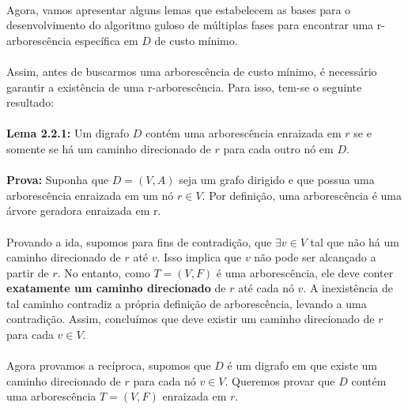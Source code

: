 \documentclass[12pt,a4paper]{article}
\begin{document}
\paragraph{}
Agora, vamos apresentar alguns lemas que estabelecem as bases para o desenvolvimento do algoritmo guloso de múltiplas fases para encontrar uma r-arborescência específica em \(D \) de custo mínimo.

\paragraph{}
Assim, antes de buscarmos uma arborescência de custo mínimo, é necessário garantir a existência de uma r-arborescência. Para isso, tem-se o seguinte resultado:

\paragraph{}
\textbf{Lema 2.2.1:} Um digrafo \(D\) contém uma arborescência enraizada em \(r\) se e somente se há um caminho direcionado de \(r\) para cada outro nó em \(D\).

\paragraph{}
\textbf{Prova:} Suponha que \(D = (V, A)\) seja um grafo dirigido e que possua uma arborescência enraizada em um nó \(r \in V\). Por definição, uma arborescência é uma árvore geradora enraizada em r.

\paragraph{}
Provando a ida, supomos para fins de contradição, que \(\exists v \in V\) tal que não há um caminho direcionado de \(r\) até \(v\). Isso implica que \(v\) não pode ser alcançado a partir de \(r\). No entanto, como \(T = (V, F)\) é uma arborescência, ele deve conter \textbf{exatamente um caminho direcionado} de \(r\) até cada nó \(v\). A inexistência de tal caminho contradiz a própria definição de arborescência, levando a uma contradição. Assim, concluímos que deve existir um caminho direcionado de \(r\) para cada \(v \in V\).

\paragraph{}
Agora provamos a recíproca, supomos que \( D \) é um digrafo em que existe um caminho direcionado de \( r \) para cada nó \( v \in V \). Queremos provar que \( D \) contém uma arborescência \(T = (V, F) \) enraizada em \( r \).
\end{document}
